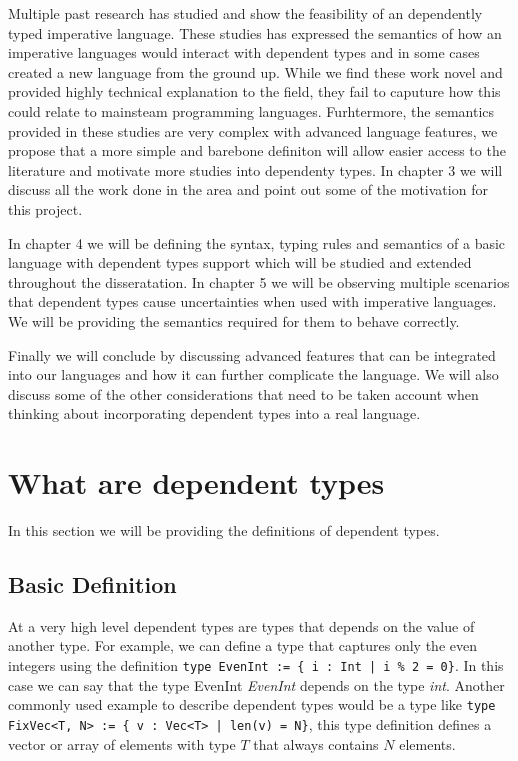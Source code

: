 \documentclass[a4paper,12pt]{report}
\begin{document}
\par
Multiple past research has studied and show the feasibility of an dependently typed 
imperative language. These studies has expressed the semantics of 
how an imperative languages would interact with dependent types and in some 
cases created a new language from the ground up. While we find these work novel 
and provided highly technical explanation to the field, they fail to caputure 
how this could relate to mainsteam programming languages. Furhtermore, the 
semantics provided in these studies are very complex with advanced language 
features, we propose that a more simple and barebone definiton will allow easier 
access to the literature and motivate more studies into dependenty types. In 
chapter 3 we will discuss all the work done in the area and point out some of the 
motivation for this project.

\par
In chapter 4 we will be defining the syntax, typing rules and semantics 
of a basic language with dependent types support which will be studied 
and extended throughout the disseratation. In chapter 5 we will be observing 
multiple scenarios that dependent types cause uncertainties when used with 
imperative languages. We will be providing the semantics required for them 
to behave correctly.

\par
Finally we will conclude by discussing advanced features that can be integrated 
into our languages and how it can further complicate the language. We will also 
discuss some of the other considerations that need to be taken account when 
thinking about incorporating dependent types into a real language. 

\section{What are dependent types}
In this section we will be providing the definitions of dependent types.

\subsection{Basic Definition}
At a very high level dependent types are types that depends on the value of 
another type. For example, we can define a type that captures only the even 
integers using the definition 
\verb+type EvenInt := { i : Int | i % 2 = 0}+. In this case we 
can say that the type EvenInt \textit{EvenInt} depends on the type \textit{int}.
Another commonly used example to describe dependent types would be a type like 
\verb+type FixVec<T, N> := { v : Vec<T> | len(v) = N}+, this type definition defines 
a vector or array of elements with type $T$ that always contains $N$ elements.
\end{document}
